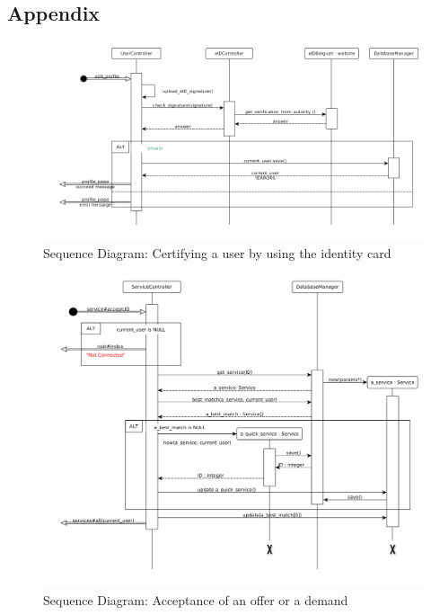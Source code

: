 \begin{landscape}

\section{Appendix}

\begin{figure}[!ht]
	\begin{center}
		\includegraphics[width=.8\paperheight]{check_ID.png}
		\caption{Sequence Diagram: Certifying a user by using the identity card}
		\label{fig:eID_big}
	\end{center}
\end{figure}

\newpage

\begin{figure}[H]
	\begin{center}
		\includegraphics[width=.625\paperheight]{service_accepted.png} %
		\caption{Sequence Diagram: Acceptance of an offer or a demand}
		\label{fig:acceptService_big}
	\end{center}
\end{figure}


\end{landscape}
